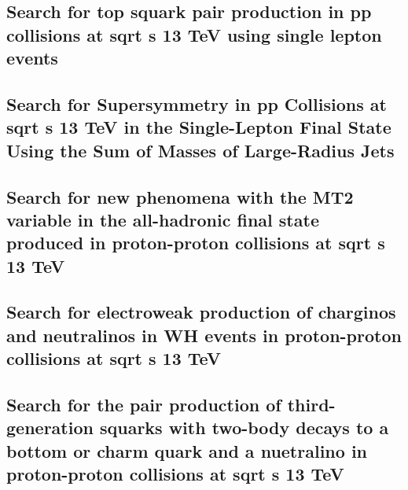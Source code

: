 \documentclass[a4paper, 11pt, twoside, openright]{report}
\begin{document}
\subsection{Search for top squark pair production in pp collisions at sqrt s 13 TeV using single lepton events}


\subsection{Search for Supersymmetry in pp Collisions at sqrt s 13 TeV in the Single-Lepton Final State Using the Sum of Masses of Large-Radius Jets}


\subsection{Search for new phenomena with the MT2 variable in the all-hadronic final state produced in proton-proton collisions at sqrt s 13 TeV}


\subsection{Search for electroweak production of charginos and neutralinos in WH events in proton-proton collisions at sqrt s 13 TeV}


\subsection{Search for the pair production of third-generation squarks with two-body decays to a bottom or charm quark and a nuetralino in proton-proton collisions at sqrt s 13 TeV}

\end{document}
